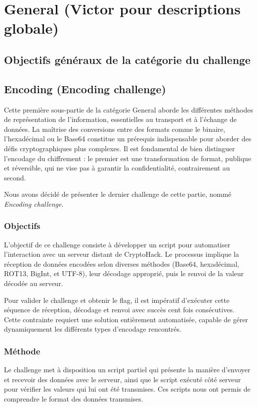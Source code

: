 \section{General (Victor pour descriptions globale)}
\subsection{Objectifs généraux de la catégorie du challenge}

\subsection{Encoding (Encoding challenge)}
Cette première sous-partie de la catégorie General aborde les différentes
méthodes de représentation de l'information, essentielles au transport et
à l'échange de données. La maîtrise des conversions entre des formats
comme le binaire, l'hexadécimal ou le Base64 constitue un prérequis
indispensable pour aborder des défis cryptographiques plus complexes. Il
est fondamental de bien distinguer l'encodage du chiffrement : le premier
est une transformation de format, publique et réversible, qui ne vise pas
à garantir la confidentialité, contrairement au second.

Nous avons décidé de présenter le dernier challenge de cette partie, nommé
\textit{Encoding challenge}.

\subsubsection{Objectifs}
L'objectif de ce challenge consiste à développer un script pour automatiser
l'interaction avec un serveur distant de CryptoHack. Le processus implique
la réception de données encodées selon diverses méthodes (Base64,
hexadécimal, ROT13, BigInt, et UTF-8), leur décodage approprié, puis le
renvoi de la valeur décodée au serveur.

Pour valider le challenge et obtenir le flag, il est impératif d'exécuter
cette séquence de réception, décodage et renvoi avec succès cent fois
consécutives. Cette contrainte requiert une solution entièrement
automatisée, capable de gérer dynamiquement les différents types
d'encodage rencontrés.

\subsubsection{Méthode}
Le challenge met à disposition un script partiel qui présente la manière
d'envoyer et recevoir des données avec le serveur, ainsi que le script
exécuté côté serveur pour vérifier les valeurs qui lui ont été transmises.
Ces scripts nous ont permis de comprendre le format des données transmises.

